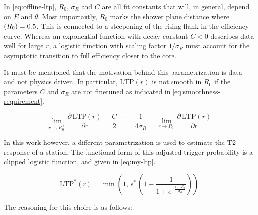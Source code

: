In \autoref{eq:offline-ltp}, $R_0$, $\sigma_R$ and $C$ are all fit constants that will, in general, depend on $E$ and $\theta$. Most importantly, $R_0$ marks the 
shower plane distance where $\text(R_0) = 0.5$. This is connected to a steepening of the rising flank in the efficiency curve. Whereas an exponential function with
decay constant $C<0$ describes data well for large $r$, a logistic function with scaling factor $1/\sigma_R$ must account for the asymptotic transition to full 
efficiency closer to the core.

It must be mentioned that the motivation behind this parametrization is data- and not physics driven. In particular, $\text{LTP}(r)$ is not smooth in $R_0$ if the 
parameters $C$ and $\sigma_R$ are not finetuned as indicated in \autoref{eq:smoothness-requirement}.

\begin{equation}
	\label{eq:smoothness-requirement}
	\lim\limits_{r \to R_0^+} \frac{\partial\,\text{LTP}(r)}{\partial r} = \frac{C}{2} \;\; \stackrel{!}{=} \;\; \frac{1}{4\sigma_R} = \lim\limits_{r \to R_0^-} \frac{\partial\,\text{LTP}(r)}{\partial r}
\end{equation}

In this work however, a different parametrization is used to estimate the T2 response of a station. The functional form of this adjusted trigger probability is
a clipped logistic function, and given in \autoref{eq:my-ltp}.

\begin{equation}
	\label{eq:my-ltp}
	\text{LTP}^*(r) = \min\left(1,\,\epsilon^*\,\left(1 - \frac{1}{1+e^{-\frac{r-R_0}{\sigma_R}}}\right)\right)
\end{equation}

The reasoning for this choice is as follows:


